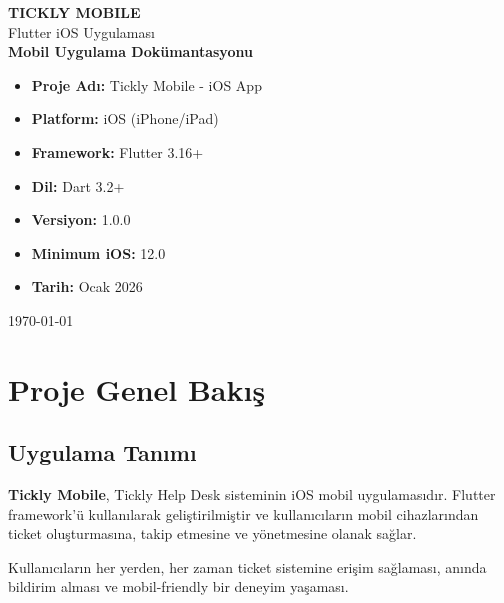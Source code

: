 \documentclass[12pt,a4paper]{article}
\begin{document}
\begin{titlepage}
    \centering
    \vspace*{2cm}
    
    {\Huge \textbf{TICKLY MOBILE}}\\[0.5cm]
    {\LARGE Flutter iOS Uygulaması}\\[2cm]
    
    {\Large \textbf{Mobil Uygulama Dokümantasyonu}}\\[1cm]
    
    \vfill
    
    \begin{tcolorbox}[colback=blue!5!white,colframe=blue!75!black,title=Proje Bilgileri]
        \begin{itemize}[leftmargin=*]
            \item \textbf{Proje Adı:} Tickly Mobile - iOS App
            \item \textbf{Platform:} iOS (iPhone/iPad)
            \item \textbf{Framework:} Flutter 3.16+
            \item \textbf{Dil:} Dart 3.2+
            \item \textbf{Versiyon:} 1.0.0
            \item \textbf{Minimum iOS:} 12.0
            \item \textbf{Tarih:} Ocak 2026
        \end{itemize}
    \end{tcolorbox}
    
    \vfill
    
    {\large \today}
\end{titlepage}

\tableofcontents
\newpage

\section{Proje Genel Bakış}

\subsection{Uygulama Tanımı}

\textbf{Tickly Mobile}, Tickly Help Desk sisteminin iOS mobil uygulamasıdır. Flutter framework'ü kullanılarak geliştirilmiştir ve kullanıcıların mobil cihazlarından ticket oluşturmasına, takip etmesine ve yönetmesine olanak sağlar.

\begin{tcolorbox}[colback=green!5!white,colframe=green!75!black,title=Ana Hedef]
Kullanıcıların her yerden, her zaman ticket sistemine erişim sağlaması, anında bildirim alması ve mobil-friendly bir deneyim yaşaması.
\end{tcolorbox}
\end{document}
